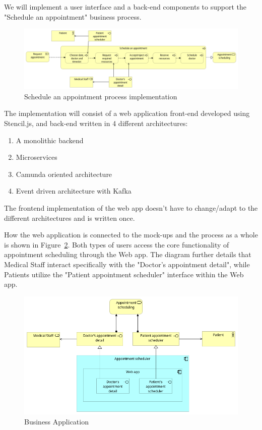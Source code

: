 \documentclass[11pt,english,a4paper,twoside]{article}
\begin{document}
We will implement a user interface and a back-end components to
support the "Schedule an appointment" business process.

\begin{figure}[H]
    \centering
    \includegraphics[width=\textwidth]{./fig/1. Business Implementation.png}
    \caption{Schedule an appointment process implementation}
    \label{fig:business-application}
\end{figure}

The implementation
will consist of a web application front-end developed using Stencil.js,
and back-end written in 4 different architectures:

\begin{enumerate}
    \item A monolithic backend
    \item Microservices
    \item Camunda oriented architecture
    \item Event driven architecture with Kafka
\end{enumerate}

The frontend implementation of the web app doesn't have to change/adapt
to the different architectures and is written once.

How the web application is connected to the mock-ups and the process as a whole is
shown in Figure~\ref{fig:business-application}. Both types of users access the core functionality of appointment scheduling through the Web app. The diagram further details that Medical Staff interact specifically with the "Doctor's appointment detail", while Patients utilize the "Patient appointment scheduler" interface within the Web app.

\begin{figure}[H]
    \centering
    \includegraphics[width=\textwidth]{./fig/4. Business Application.png}
    \caption{Business Application}
    \label{fig:business-application}
\end{figure}
\end{document}
